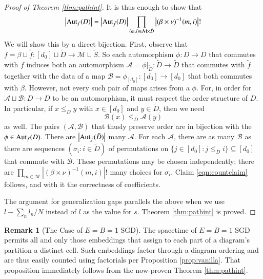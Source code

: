 \documentclass{article}
\theoremstyle{plain}
\theoremstyle{definition}
\newtheorem{rmk}{Remark}
\newcommand{\wabs}[1]{\left|#1\right|}
\newcommand{\Aut}{\text{\textnormal{Aut}}}
\newcommand{\Aa}{\mathcal{A}}
\newcommand{\Bb}{\mathcal{B}}
\newcommand{\Mm}{\mathcal{M}}
\begin{document}
\begin{proof}[Proof of Theorem \ref{thm:pathint}]
            It is thus enough to show that
            \begin{align*} \label{eqn:countclaim}
                \wabs{\Aut_f(D)} = 
                \wabs{\Aut_{\tilde f}(D)}
                \prod_{(m, i) \in \Mm \times \tilde D}
                    \wabs{(\beta \times \nu)^{-1}(m, i)}!
            \end{align*}
            We will show this by a direct bijection.  First, observe that
            $
                f = \beta \sqcup \tilde f:
                    [d_0] \sqcup \tilde D \to \Mm \sqcup \tilde S
            $. 
            So each automorphism $\phi: D\to D$ that commutes with $f$ induces
            both an automorphism
            $
                \Aa = \phi|_{\tilde D}: \tilde D\to \tilde D
            $
            that commutes with $\tilde f$ together with the data of a map
            $
                \Bb = \phi_{[d_0]}: [d_0] \to [d_0] 
            $
            that both commutes with $\beta$.  However, not every such pair of
            maps arises from a $\phi$.  For, in order for $\Aa \sqcup \Bb: D
            \to D$ to be an automorphism, it must respect the order structure
            of $D$.  In particular, if $x\leq_D y$ with $x \in [d_0]$ and $y
            \in \tilde D$, then we need
            $$
                \Bb(x) \leq_D \Aa(y)
            $$
            as well.  The
            pairs $(\Aa, \Bb)$ that thusly preserve order are in bijection with
            the $\phi \in \Aut_f(D)$.  There are $\wabs{\Aut_{\tilde f}(\tilde
            D)}$ many $\Aa$.  For each $\Aa$, there are as many $\Bb$ as there
            are sequences $(\sigma_i: i \in \tilde D)$ of permutations on
            $
                \{j\in [d_0]: j\leq_D i\} \subseteq [d_0]
            $ 
            that commute with $\Bb$.  These permutations may be chosen
            independently; there are 
            $
                \prod_{m\in \Mm}
                    \wabs{(\beta \times \nu)^{-1}(m, i)}!
            $
            many choices for $\sigma_i$.  Claim \ref{eqn:countclaim} follows,
            and with it the correctness of coefficients.
 
            The argument for generalization gaps parallels the above when we
            use $l-\sum_n l_n/N$ instead of $l$ as the value for $s$. 
            Theorem \ref{thm:pathint} is proved.
        \end{proof}

        \begin{rmk}[The Case of $E=B=1$ SGD]
            The spacetime of $E=B=1$ SGD permits all and only those
            embeddings that assign to each part of a diagram's partition  a
            distinct cell.  Such embeddings factor through a diagram
            ordering and are thus easily counted using factorials per
            Proposition \ref{prop:vanilla}.  That proposition immediately
            follows from the now-proven Theorem \ref{thm:pathint}.
        \end{rmk}
\end{document}
